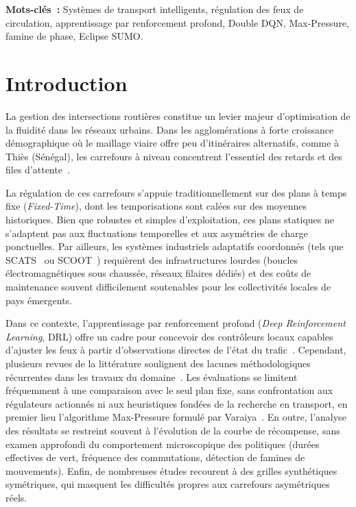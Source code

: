 \documentclass[10pt,twocolumn,letterpaper]{article}
\begin{document}
\vspace{0.2cm}
\noindent\textbf{Mots-clés~:} Systèmes de transport intelligents, régulation des feux de circulation, apprentissage par renforcement profond, Double DQN, Max-Pressure, famine de phase, Eclipse SUMO.
\vspace{0.3cm}

\section{Introduction}
\label{sec:intro}

La gestion des intersections routières constitue un levier majeur d'optimisation de la fluidité dans les réseaux urbains. Dans les agglomérations à forte croissance démographique où le maillage viaire offre peu d'itinéraires alternatifs, comme à Thiès (Sénégal), les carrefours à niveau concentrent l'essentiel des retards et des files d'attente~\cite{haydari2022deep}.

La régulation de ces carrefours s'appuie traditionnellement sur des plans à temps fixe (\emph{Fixed-Time}), dont les temporisations sont calées sur des moyennes historiques. Bien que robustes et simples d'exploitation, ces plans statiques ne s'adaptent pas aux fluctuations temporelles et aux asymétries de charge ponctuelles. Par ailleurs, les systèmes industriels adaptatifs coordonnés (tels que SCATS~\cite{lowrie1990scats} ou SCOOT~\cite{hunt1981scoot}) requièrent des infrastructures lourdes (boucles électromagnétiques sous chaussée, réseaux filaires dédiés) et des coûts de maintenance souvent difficilement soutenables pour les collectivités locales de pays émergents.

Dans ce contexte, l'apprentissage par renforcement profond (\emph{Deep Reinforcement Learning}, DRL) offre un cadre pour concevoir des contrôleurs locaux capables d'ajuster les feux à partir d'observations directes de l'état du trafic~\cite{wei2018intellilight,wei2019presslight,chen2020toward,zhang2020pdlight}. Cependant, plusieurs revues de la littérature soulignent des lacunes méthodologiques récurrentes dans les travaux du domaine~\cite{wei2021survey,zhao2024survey}. Les évaluations se limitent fréquemment à une comparaison avec le seul plan fixe, sans confrontation aux régulateurs actionnés ni aux heuristiques fondées de la recherche en transport, en premier lieu l'algorithme Max-Pressure formulé par Varaiya~\cite{varaiya2013max}. En outre, l'analyse des résultats se restreint souvent à l'évolution de la courbe de récompense, sans examen approfondi du comportement microscopique des politiques (durées effectives de vert, fréquence des commutations, détection de famines de mouvements). Enfin, de nombreuses études recourent à des grilles synthétiques symétriques, qui masquent les difficultés propres aux carrefours asymétriques réels.
\end{document}
